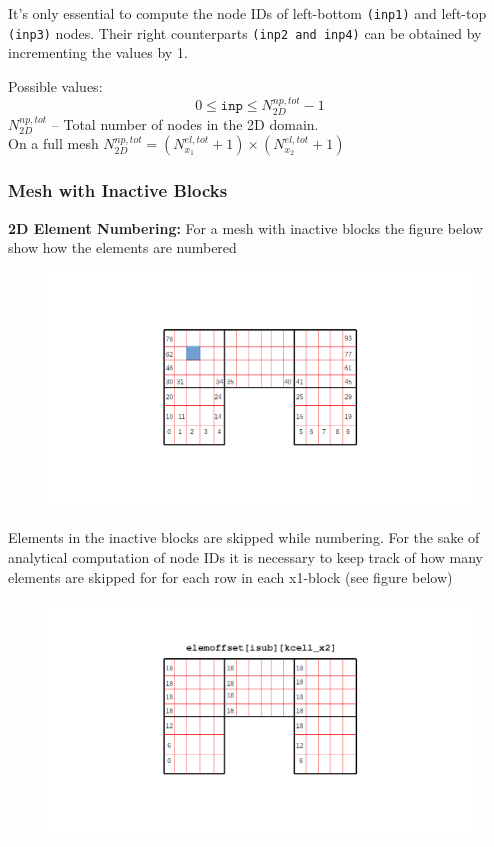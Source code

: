 \documentclass[a4paper,12pt]{article}
\begin{document}
It's only essential to compute the node IDs of left-bottom \texttt{(inp1)} and left-top \texttt{(inp3)} nodes. Their right counterparts \texttt{(inp2 and inp4)} can be obtained by incrementing the values by 1. 

\noindent Possible values:
\begin{equation*}
0 \le \texttt{inp} \le N^{np,tot}_{2D}-1
\end{equation*}
$N^{np,tot}_{2D}$ -- Total number of nodes in the 2D domain.\\ On a full mesh $N^{np,tot}_{2D} = \left(N^{el,tot}_{x_1}+1\right)\times \left(N^{el,tot}_{x_2}+1\right)$

\subsubsection{Mesh with Inactive Blocks}
\textbf{2D Element Numbering:}  For a mesh with inactive blocks the figure below show how the elements are numbered
\begin{figure}[H]
	\centering
	\includegraphics[trim=140 100 200 100,clip,scale=0.35]{figures/InactiveMesh_ElemNumbered.png}		
\end{figure}
Elements in the inactive blocks are skipped while numbering. For the sake of analytical computation of node IDs it is necessary to keep track of how many elements are skipped for for each row in each x1-block (see figure below)  
\begin{figure}[H]
	\centering
	\includegraphics[trim=140 100 200 100,clip,scale=0.35]{figures/ElemOffset.png}		
\end{figure}
\end{document}
